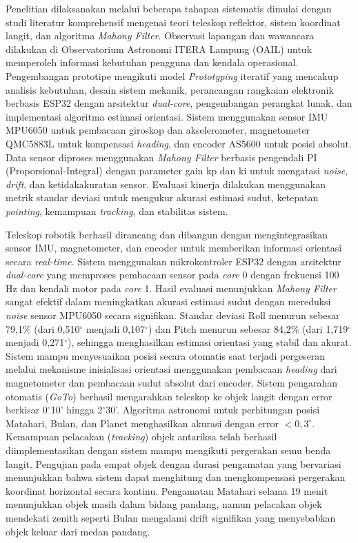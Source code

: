 \begin{center}
	Penelitian dilaksanakan melalui beberapa tahapan sistematis dimulai dengan studi literatur komprehensif mengenai teori teleskop reflektor, sistem koordinat langit, dan algoritma \textit{Mahony Filter}. Observasi lapangan dan wawancara dilakukan di Observatorium Astronomi ITERA Lampung (OAIL) untuk memperoleh informasi kebutuhan pengguna dan kendala operasional. Pengembangan prototipe mengikuti model \textit{Prototyping} iteratif yang mencakup analisis kebutuhan, desain sistem mekanik, perancangan rangkaian elektronik berbasis ESP32 dengan arsitektur \textit{dual-core}, pengembangan perangkat lunak, dan implementasi algoritma estimasi orientasi. Sistem menggunakan sensor IMU MPU6050 untuk pembacaan giroskop dan akselerometer, magnetometer QMC5883L untuk kompensasi \textit{heading}, dan encoder AS5600 untuk posisi absolut. Data sensor diproses menggunakan \textit{Mahony Filter} berbasis pengendali PI (Proporsional-Integral) dengan parameter gain kp dan ki untuk mengatasi \textit{noise}, \textit{drift}, dan ketidakakuratan sensor. Evaluasi kinerja dilakukan menggunakan metrik standar deviasi untuk mengukur akurasi estimasi sudut, ketepatan \textit{pointing}, kemampuan \textit{tracking}, dan stabilitas sistem.\par
	
	Teleskop robotik berhasil dirancang dan dibangun dengan mengintegrasikan sensor IMU, magnetometer, dan encoder untuk memberikan informasi orientasi secara \textit{real-time}. Sistem menggunakan mikrokontroler ESP32 dengan arsitektur \textit{dual-core} yang memproses pembacaan sensor pada \textit{core} 0 dengan frekuensi 100 Hz dan kendali motor pada \textit{core} 1. Hasil evaluasi menunjukkan \textit{Mahony Filter} sangat efektif dalam meningkatkan akurasi estimasi sudut dengan mereduksi \textit{noise} sensor MPU6050 secara signifikan. Standar deviasi Roll menurun sebesar 79,1\% (dari 0,510$^{\circ}$ menjadi 0,107$^{\circ}$) dan Pitch menurun sebesar 84,2\% (dari 1,719$^{\circ}$ menjadi 0,271$^{\circ}$), sehingga menghasilkan estimasi orientasi yang stabil dan akurat. Sistem mampu menyesuaikan posisi secara otomatis saat terjadi pergeseran melalui mekanisme inisialisasi orientasi menggunakan pembacaan \textit{heading} dari magnetometer dan pembacaan sudut absolut dari encoder. Sistem pengarahan otomatis (\textit{GoTo}) berhasil mengarahkan teleskop ke objek langit dengan error berkisar 0$^{\circ}$10' hingga 2$^{\circ}$30'. Algoritma astronomi untuk perhitungan posisi Matahari, Bulan, dan Planet menghasilkan akurasi dengan error $< 0,3^{\circ}$. Kemampuan pelacakan (\textit{tracking}) objek antariksa telah berhasil diimplementasikan dengan sistem mampu mengikuti pergerakan semu benda langit. Pengujian pada empat objek dengan durasi pengamatan yang bervariasi menunjukkan bahwa sistem dapat menghitung dan mengkompensasi pergerakan koordinat horizontal secara kontinu. Pengamatan Matahari selama 19 menit menunjukkan objek masih dalam bidang pandang, namun pelacakan objek mendekati zenith seperti Bulan mengalami drift signifikan yang menyebabkan objek keluar dari medan pandang.\par
	

\end{center}
